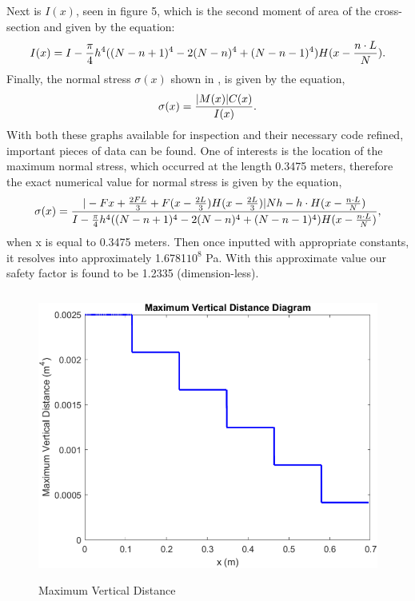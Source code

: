 \documentclass[12pt]{article}
\begin{document}
Next is $I(x)$, seen in figure 5, which is the second moment of area of the cross-section and given by the equation:
\begin{equation}
  \centering
   I(x) = I - \frac{\pi}{4}h^4((N - n + 1)^4 - 2(N - n)^4 +(N - n - 1)^4)H(x - \frac{n\cdot{L}}{N}).
  \end{equation}
 Finally, the normal stress $σ(x)$ shown in , is given by the equation,
 \begin{equation}
  \centering
   \sigma(x) =  \frac{|M(x)|C(x)}{I(x)}.
  \end{equation}
  With both these graphs available for inspection and their necessary code refined, important pieces of data can be found. One of interests is the location of the maximum normal stress, which occurred at the length 0.3475 meters, therefore the exact numerical value for normal stress is given by the equation,
  \begin{equation}
  \centering
   \sigma(x) = \frac{|-Fx + \frac{2FL}{3} + F(x - \frac{2L}{3})H(x - \frac{2L}{3})|Nh - h \cdot H(x -\frac{n \cdot{L}}{N})}{I - \frac{\pi}{4}h^4((N - n + 1)^4 - 2(N - n)^4 +(N - n - 1)^4)H(x - \frac{n\cdot{L}}{N})},
  \end{equation}
  when x is equal to 0.3475 meters. Then once inputted with appropriate constants, it resolves into approximately 1.6781\cdot$10^{8}$ Pa. With this approximate value our safety factor is found to be 1.2335 (dimension-less).

\begin{figure}[H]
\centering
\includegraphics[height= 9.5cm, width= 12.5cm]{Max_Vertical_Distance.png}
\caption{Maximum Vertical Distance}
\label{Figure 4}
\end{figure}
\end{document}
